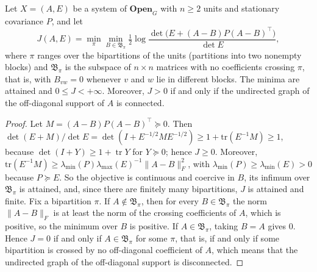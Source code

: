 \begin{lemma}\label{lem:J}
Let $X=(A,E)$ be a system of $\mathbf{Open}_G$ with $n\ge2$ units and stationary covariance $P$, and let
\[
J(A,E)=\min_\pi\min_{B\in\mathfrak B_\pi}\tfrac12\log\frac{\det\bigl(E+(A-B)P(A-B)^\top\bigr)}{\det E},
\]
where $\pi$ ranges over the bipartitions of the units (partitions into two nonempty blocks) and $\mathfrak B_\pi$ is the subspace of $n\times n$ matrices with no coefficients crossing $\pi$, that is, with $B_{vw}=0$ whenever $v$ and $w$ lie in different blocks. The minima are attained and $0\le J<+\infty$. Moreover, $J>0$ if and only if the undirected graph of the off-diagonal support of $A$ is connected.
\end{lemma}
\begin{proof}
Let $M=(A-B)P(A-B)^\top\succeq0$. Then $\det(E+M)/\det E=\det(I+E^{-1/2}ME^{-1/2})\ge1+\mathrm{tr}(E^{-1}M)\ge1$, because $\det(I+Y)\ge1+\operatorname{tr}Y$ for $Y\succeq0$; hence $J\ge0$. Moreover, $\mathrm{tr}(E^{-1}M)\ge\lambda_{\min}(P)\lambda_{\max}(E)^{-1}\lVert A-B\rVert_F^2$, with $\lambda_{\min}(P)\ge\lambda_{\min}(E)>0$ because $P\succeq E$. So the objective is continuous and coercive in $B$, its infimum over $\mathfrak B_\pi$ is attained, and, since there are finitely many bipartitions, $J$ is attained and finite. Fix a bipartition $\pi$. If $A\notin\mathfrak B_\pi$, then for every $B\in\mathfrak B_\pi$ the norm $\lVert A-B\rVert_F$ is at least the norm of the crossing coefficients of $A$, which is positive, so the minimum over $B$ is positive. If $A\in\mathfrak B_\pi$, taking $B=A$ gives $0$. Hence $J=0$ if and only if $A\in\mathfrak B_\pi$ for some $\pi$, that is, if and only if some bipartition is crossed by no off-diagonal coefficient of $A$, which means that the undirected graph of the off-diagonal support is disconnected.
\end{proof}
